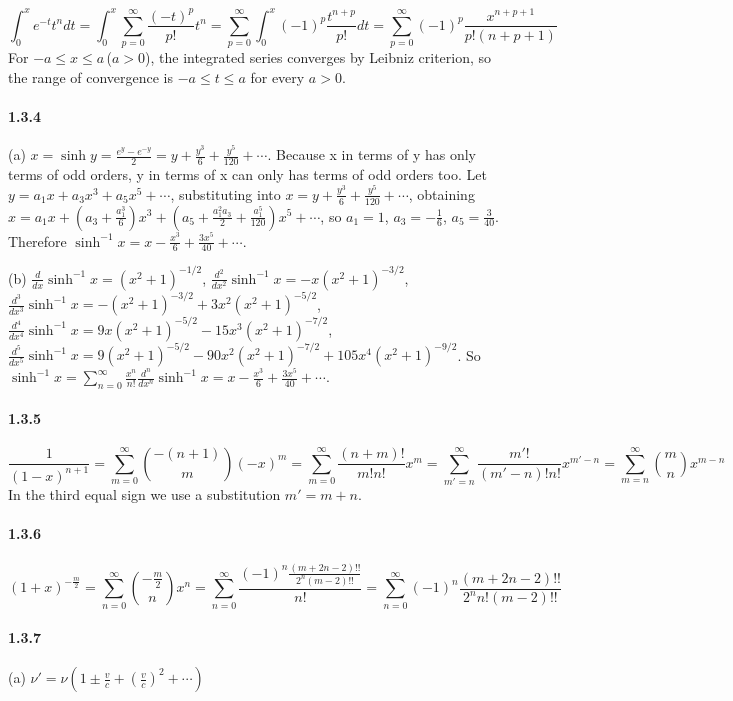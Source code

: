 \documentclass[a4paper]{article}
\begin{document}
\[\int_0^x e^{-t}t^n dt=\int_0^x\sum_{p=0}^\infty\frac{(-t)^p}{p!}t^n=\sum_{p=0}^\infty\int_0^x(-1)^p\frac{t^{n+p}}{p!}dt=\sum_{p=0}^\infty(-1)^p\frac{x^{n+p+1}}{p!(n+p+1)}\]
For $-a\leq x\leq a$\,($a>0$), the integrated series converges by Leibniz criterion, so the range of convergence is $-a\leq t\leq a$ for every $a>0$. 

\paragraph{1.3.4}
(a) $x=\sinh{y}=\frac{e^y-e^{-y}}{2}=y+\frac{y^3}{6}+\frac{y^5}{120}+\cdots$. Because x in terms of y has only terms of odd orders, y in terms of x can only has terms of odd orders too. Let $y=a_1x+a_3x^3+a_5x^5+\cdots$, substituting into $x=y+\frac{y^3}{6}+\frac{y^5}{120}+\cdots$, obtaining $x=a_1x+(a_3+\frac{a_1^3}{6})x^3+(a_5+\frac{a_1^2a_3}{2}+\frac{a_1^5}{120})x^5+\cdots$, so $a_1=1$, $a_3=-\frac{1}{6}$, $a_5=\frac{3}{40}$. Therefore  $\sinh^{-1}x=x-\frac{x^3}{6}+\frac{3x^5}{40}+\cdots$.
\medskip

(b) $\frac{d}{dx}\sinh^{-1}x=(x^2+1)^{-1/2}$, $\frac{d^2}{dx^2}\sinh^{-1}x=-x(x^2+1)^{-3/2}$, $\frac{d^3}{dx^3}\sinh^{-1}x=-(x^2+1)^{-3/2}+3x^2(x^2+1)^{-5/2}$, $\frac{d^4}{dx^4}\sinh^{-1}x=9x(x^2+1)^{-5/2}-15x^3(x^2+1)^{-7/2}$, $\frac{d^5}{dx^5}\sinh^{-1}x=9(x^2+1)^{-5/2}-90x^2(x^2+1)^{-7/2}+105x^4(x^2+1)^{-9/2}$. So $\sinh^{-1}x=\sum_{n=0}^\infty\frac{x^n}{n!}\frac{d^n}{dx^n}\sinh^{-1}x=x-\frac{x^3}{6}+\frac{3x^5}{40}+\cdots$.

\paragraph{1.3.5}
\[\frac{1}{(1-x)^{n+1}}=\sum_{m=0}^\infty\binom{-(n+1)}{m}(-x)^m=\sum_{m=0}^\infty\frac{(n+m)!}{m!n!}x^m=\sum_{m'=n}^\infty\frac{m'!}{(m'-n)!n!}x^{m'-n}=\sum_{m=n}^\infty\binom{m}{n}x^{m-n}\]
In the third equal sign we use a substitution $m'=m+n$.

\paragraph{1.3.6}
\[(1+x)^{-\frac{m}{2}}=\sum_{n=0}^\infty\binom{-\frac{m}{2}}{n}x^n=\sum_{n=0}^\infty\frac{(-1)^n\frac{(m+2n-2)!!}{2^n (m-2)!!}}{n!}=\sum_{n=0}^\infty(-1)^n\frac{(m+2n-2)!!}{2^n n!(m-2)!!}\]

\paragraph{1.3.7}
(a) $\nu'=\nu(1\pm \frac{v}{c}+(\frac{v}{c})^2+\cdots) $
\end{document}
